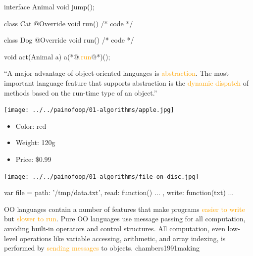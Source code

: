 \documentclass{article}
\newcommand\hlt[1]{\textcolor{orange}{#1}}
\begin{document}
\begin{multicols}{2}
{\small\begin{ffcode}
interface Animal
  void jump();

class Cat
  @Override
  void run() { /* code */ }

class Dog
  @Override
  void run() { /* code */ }

void act(Animal a)
  a(*@\textcolor{orange}{.run}@*)();
\end{ffcode}
}
\par\columnbreak\par
  ``A major advantage of object-oriented languages is \hlt{abstraction}. The most important language feature that supports abstraction is the \hlt{dynamic dispatch} of methods based on the run-time type of an object.''
  \end{multicols}
  \plush{}

  \begin{multicols}{2}
  \texttt{[image: ../../painofoop/01-algorithms/apple.jpg]}
  \begin{itemize}
  \setlength\itemsep{0em}
  \item Color: red
  \item Weight: 120g
  \item Price: \$0.99
  \end{itemize}
  \par\columnbreak\par
  \texttt{[image: ../../painofoop/01-algorithms/file-on-disc.jpg]}
  \par
{\small\begin{ffcode}
var file = {
  path: '/tmp/data.txt',
  read: function() { ... },
  write: function(txt) { ... }
}
\end{ffcode}
}
  \end{multicols}
  \plush{}


  {OO languages contain a number of features that make programs \hlt{easier to write} but \hlt{slower to run}. Pure OO languages use message passing for all computation, avoiding built-in operators and control structures. All computation, even low-level operations like variable accessing, arithmetic, and array indexing, is performed by \hlt{sending messages} to objects.}
  {chambers1991making}
\end{document}
